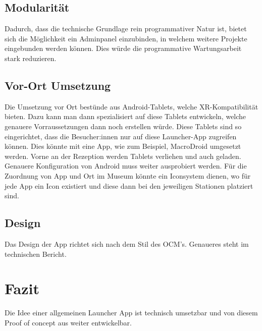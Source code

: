 \subsection{Modularität}
Dadurch, dass die technische Grundlage rein programmativer Natur ist, bietet sich die Möglichkeit ein Adminpanel einzubinden, in welchem weitere Projekte eingebunden werden können. Dies würde die programmative Wartungsarbeit stark reduzieren.

\subsection{Vor-Ort Umsetzung}
Die Umsetzung vor Ort bestünde aus Android-Tablets, welche XR-Kompatibilität bieten. Dazu kann man dann spezialisiert auf diese Tablets entwickeln, welche genauere Vorraussetzungen dann noch erstellen würde. Diese Tablets sind so eingerichtet, dass die Besucher:innen nur auf diese Launcher-App zugreifen können. Dies könnte mit eine App, wie zum Beispiel, MacroDroid umgesetzt werden. Vorne an der Rezeption werden Tablets verliehen und auch geladen. Genauere Konfiguration von Android muss weiter ausprobiert werden. Für die Zuordnung von App und Ort im Museum könnte ein Iconsystem dienen, wo für jede App ein Icon existiert und diese dann bei den jeweiligen Stationen platziert sind.

\subsection{Design}
Das Design der App richtet sich nach dem Stil des OCM's. Genaueres steht im technischen Bericht.

\section{Fazit}
Die Idee einer allgemeinen Launcher App ist technisch umsetzbar und von diesem Proof of concept aus weiter entwickelbar.